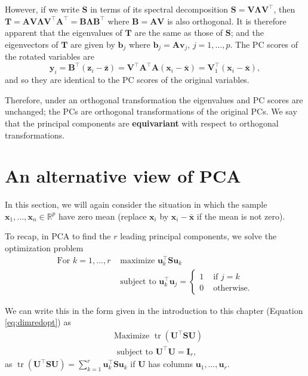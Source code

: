 \documentclass[
]{book}
\theoremstyle{definition}
\theoremstyle{definition}
\theoremstyle{definition}
\theoremstyle{definition}
\theoremstyle{remark}
\begin{document}
However, if we write \(\mathbf S\) in terms of its spectral decomposition \(\mathbf S= \mathbf V\boldsymbol \Lambda\mathbf V^\top\), then \(\mathbf T= \mathbf A\mathbf V\boldsymbol \Lambda\mathbf V^\top \mathbf A^\top = \mathbf B\boldsymbol \Lambda\mathbf B^\top\) where \(\mathbf B= \mathbf A\mathbf V\) is also orthogonal. It is therefore apparent that the eigenvalues of \(\mathbf T\) are the same as those of \(\mathbf S\); and the eigenvectors of \(\mathbf T\) are given by \(\mathbf b_j\) where \(\mathbf b_j = \mathbf A\mathbf v_j\), \(j=1,\ldots,p\). The PC scores of the rotated variables are
\[ \mathbf y_i = \mathbf B^\top (\mathbf z_i - \bar{\mathbf z}) = \mathbf V^\top \mathbf A^\top \mathbf A(\mathbf x_i - \bar{\mathbf x}) = \mathbf V_1^\top (\mathbf x_i - \bar{\mathbf x}),\]
and so they are identical to the PC scores of the original variables.

Therefore, under an orthogonal transformation the eigenvalues and PC scores are unchanged; the PCs are orthogonal transformations of the original PCs. We say that the principal components are \textbf{equivariant} with respect to orthogonal transformations.

\hypertarget{an-alternative-view-of-pca}{%
\section{An alternative view of PCA}\label{an-alternative-view-of-pca}}

In this section, we will again consider the situation in which the sample \(\mathbf x_1, \ldots , \mathbf x_n \in \mathbb{R}^p\) have zero mean (replace \(\mathbf x_i\) by \(\mathbf x_i-\bar{\mathbf x}\) if the mean is not zero).

To recap, in PCA to find the \(r\) leading principal components, we solve the optimization problem
\begin{align*}
\mbox{For } k=1, \ldots, r &\mbox{ maximize } \mathbf u_k^\top \mathbf S\mathbf u_k \\
 &\mbox{ subject to } \mathbf u_k^\top \mathbf u_j = \begin{cases}
 1  &\mbox{ if } j=k\\
 0 & \mbox{ otherwise.}
 \end{cases}
 \end{align*}

We can write this in the form given in the introduction to this chapter (Equation \eqref{eq:dimredopt}) as
\begin{align*}
&\mbox{Maximize } \operatorname{tr}(\mathbf U^\top \mathbf S\mathbf U) \\
 &\mbox{ subject to } \mathbf U^\top \mathbf U=\mathbf I_r,
 \end{align*}
as \(\operatorname{tr}(\mathbf U^\top \mathbf S\mathbf U) = \sum_{k=1}^r \mathbf u_k^\top \mathbf S\mathbf u_k\) if \(\mathbf U\) has columns \(\mathbf u_1, \ldots, \mathbf u_r\).
\end{document}
